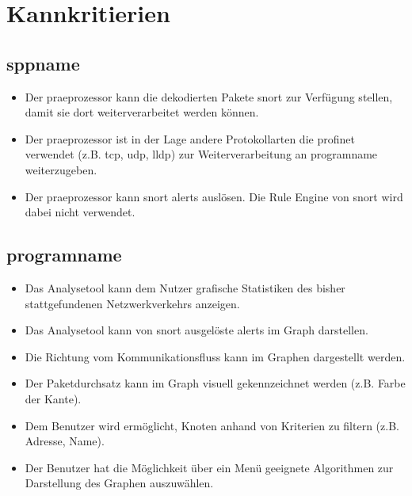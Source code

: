 \section{Kannkritierien}

\subsection{\gls{sppname}}

\begin{itemize}

\item Der \gls{praeprozessor} kann die dekodierten Pakete \gls{snort} zur Verfügung stellen, damit sie dort weiterverarbeitet werden können.

\item Der \gls{praeprozessor} ist in der Lage andere Protokollarten die \gls{profinet} verwendet (z.B. \gls{tcp}, \gls{udp}, \gls{lldp}) zur Weiterverarbeitung an \gls{programname} weiterzugeben.

\item Der \gls{praeprozessor} kann \gls{snort} \glspl{alert} auslösen. Die Rule Engine von \gls{snort} wird dabei nicht verwendet.
\end{itemize}

\subsection{\gls{programname}}

\begin{itemize}
\item Das Analysetool kann dem Nutzer grafische Statistiken des bisher stattgefundenen Netzwerkverkehrs anzeigen.

\item Das Analysetool kann von \gls{snort} ausgelöste \glspl{alert} im Graph darstellen.

\item Die Richtung vom Kommunikationsfluss kann im Graphen dargestellt werden.

\item Der Paketdurchsatz kann im Graph visuell gekennzeichnet werden (z.B. Farbe der Kante).

\item Dem Benutzer wird ermöglicht, Knoten anhand von Kriterien zu filtern (z.B. Adresse, Name).

\item Der Benutzer hat die Möglichkeit über ein Menü geeignete Algorithmen zur Darstellung des Graphen auszuwählen.
\end{itemize}


